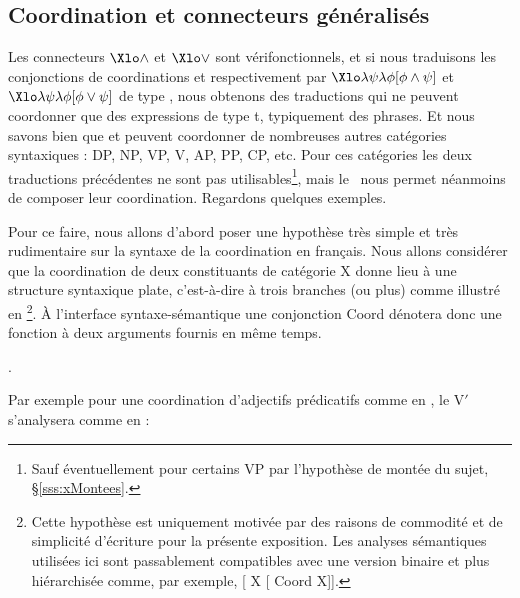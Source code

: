 \subsection{Coordination et connecteurs généralisés}
\label{ss:ConConGen}

Les connecteurs $\Xlo\wedge$ et $\Xlo\vee$ sont vérifonctionnels, et si nous traduisons les conjonctions de coordinations  et   respectivement par $\Xlo\lambda\psi\lambda\phi[\phi\wedge\psi]$ et $\Xlo\lambda\psi\lambda\phi[\phi\vee\psi]$ de type , 
nous obtenons des traductions qui ne peuvent coordonner que des expressions de type \typ t, typiquement des phrases.  Et nous savons bien que  et  peuvent coordonner de nombreuses autres catégories syntaxiques : DP, NP, VP, V, AP, PP, CP, etc.   Pour ces catégories les deux traductions précédentes ne sont pas utilisables\footnote{Sauf éventuellement pour certains VP par l'hypothèse de montée du sujet, \S\ref{sss:xMontees}.}, mais le \lcalcul\ nous permet néanmoins de composer leur coordination.  Regardons quelques exemples.

Pour ce faire, nous allons d'abord poser une hypothèse très simple et très rudimentaire sur la syntaxe de la coordination en français.  
Nous allons considérer que la coordination de deux constituants de catégorie X donne lieu à une structure syntaxique plate, c'est-à-dire à trois branches (ou plus) comme illustré en {\Next}%
\footnote{\label{fn:CoordP}Cette hypothèse est uniquement motivée par des raisons de commodité et de simplicité d'écriture pour la présente exposition. Les analyses sémantiques utilisées ici sont passablement compatibles avec une version binaire et plus hiérarchisée comme, par exemple, [ X [ Coord X]].}.
À l'interface syntaxe-sémantique une conjonction Coord dénotera donc une fonction à deux arguments fournis en même temps.


\ex.


Par exemple pour une coordination d'adjectifs prédicatifs comme en \Next[a], le V$'$ s'analysera comme en \Next[b] :

